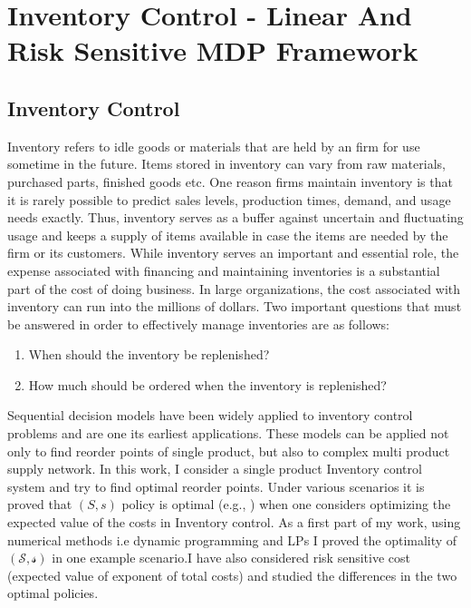 \documentclass[11pt,a4paper,oneside]{report}
\begin{document}
\chapter{Inventory Control - Linear And Risk Sensitive MDP Framework}
\section{Inventory Control}
Inventory refers to idle goods or materials that are held by an firm for use sometime in the future. Items stored in inventory can vary from raw materials, purchased parts, finished goods etc. One reason firms maintain inventory is that it is rarely possible to predict sales levels, production times, demand, and usage needs exactly. Thus, inventory serves as a buffer against uncertain and fluctuating usage and keeps a supply of items available in case the items are needed by the firm or its customers. While inventory serves an important and essential role, the expense associated with financing and maintaining inventories is a substantial part of the cost of doing business. In large organizations, the cost associated with inventory can run into the millions of dollars.
Two important questions that must be answered in order to effectively manage inventories are as follows:
\begin{enumerate}
\item When should the inventory be replenished? 
\item How much should be ordered when the inventory is replenished?
\end{enumerate}

Sequential decision models have been widely applied to inventory control problems and are one its earliest applications. These models can be applied not only to find reorder points of single product, but also to complex multi product supply network. In this work, I consider a single product Inventory control system and try to find optimal reorder points. Under various scenarios it is proved that ${(S,s)}$ policy is optimal (e.g., \citep{scarf1959optimality}) when one considers optimizing the expected value of the costs in Inventory control. As a first part of my work, using numerical methods i.e dynamic programming and LPs I proved the optimality of $\mathcal{(S,s)}$ in one example scenario.I have also considered risk sensitive cost (expected value of exponent of total costs) and studied the differences in the two optimal policies.
\end{document}
